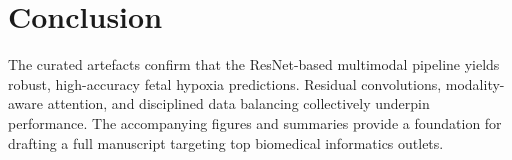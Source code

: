 \documentclass[12pt,a4paper]{article}
\begin{document}
\section{Conclusion}
The curated artefacts confirm that the ResNet-based multimodal pipeline yields robust, high-accuracy fetal hypoxia predictions. Residual convolutions, modality-aware attention, and disciplined data balancing collectively underpin performance. The accompanying figures and summaries provide a foundation for drafting a full manuscript targeting top biomedical informatics outlets.
\end{document}
